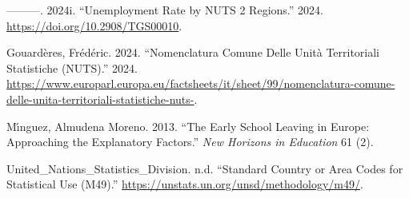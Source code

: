 \documentclass[
  letterpaper,
  DIV=11,
  numbers=noendperiod,
  abstract]{scrartcl}
\newlength{\cslhangindent}
\newenvironment{CSLReferences}[2] %
 {\begin{list}{}{%
  \setlength{\itemindent}{0pt}
  \setlength{\leftmargin}{0pt}
  \setlength{\parsep}{0pt}
  \ifodd #1
   \setlength{\leftmargin}{\cslhangindent}
   \setlength{\itemindent}{-1\cslhangindent}
  \fi
  \setlength{\itemsep}{#2\baselineskip}}}
 {\end{list}}
\begin{document}
\begin{CSLReferences}{1}{0}
---------. 2024i. {``Unemployment Rate by NUTS 2 Regions.''} 2024.
\url{https://doi.org/10.2908/TGS00010}.

Gouardères, Frédéric. 2024. {``Nomenclatura Comune Delle Unità
Territoriali Statistiche (NUTS).''} 2024.
\url{https://www.europarl.europa.eu/factsheets/it/sheet/99/nomenclatura-comune-delle-unita-territoriali-statistiche-nuts-}.

Mı́nguez, Almudena Moreno. 2013. {``The Early School Leaving in Europe:
Approaching the Explanatory Factors.''} \emph{New Horizons in Education}
61 (2).

United\_Nations\_Statistics\_Division. n.d. {``Standard Country or Area
Codes for Statistical Use (M49).''}
\url{https://unstats.un.org/unsd/methodology/m49/}.

\end{CSLReferences}
\end{document}
